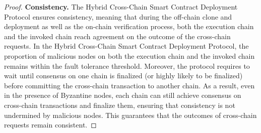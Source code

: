 \begin{proof}
\vspace{3pt}
\noindent
\textbf{Consistency. }
The Hybrid Cross-Chain Smart Contract Deployment Protocol ensures consistency, meaning that during the off-chain clone and deployment as well as the on-chain verification process, both the execution chain and the invoked chain reach agreement on the outcome of the cross-chain requests.
In the Hybrid Cross-Chain Smart Contract Deployment Protocol, the proportion of malicious nodes on both the execution chain and the invoked chain remains within the fault tolerance threshold.
Moreover, the protocol requires to wait until consensus on one chain is finalized (or highly likely to be finalized) before committing the cross-chain transaction to another chain. 
As a result, even in the presence of Byzantine nodes, each chain can still achieve consensus on cross-chain transactions and finalize them, ensuring that consistency is not undermined by malicious nodes. 
This guarantees that the outcomes of cross-chain requests remain consistent.
\end{proof}

